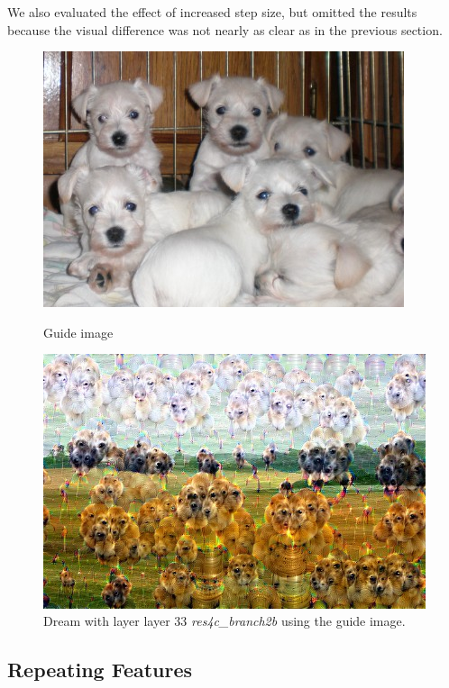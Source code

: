 We also evaluated the effect of increased step size, but omitted the results because the visual difference was not nearly as clear as in the previous section.

\begin{figure}[H]
	\centering
	\includegraphics[width=1\linewidth]{img/guide.jpg}
	\caption{Guide image\cite{imgpuppies}}
	\label{fig:guide}
	\endminipage\hfill
	\centering
	\includegraphics[width=1\linewidth]{img/guide_dream.jpg}
	\caption{Dream with layer layer 33 \emph{res4c\_branch2b} using the guide image.}
	\label{fig:guide_dream}
	\endminipage\hfill
\end{figure}



\subsection{Repeating Features}
\label{sec:repeating-features}

